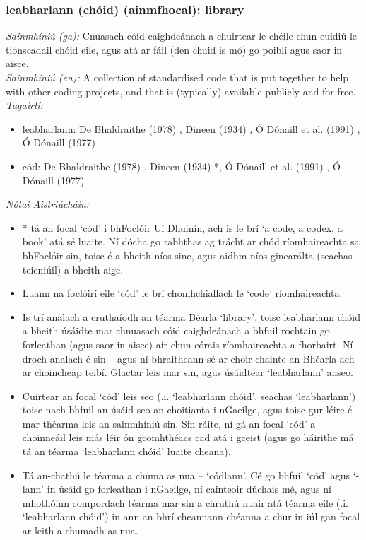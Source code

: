\documentclass{article}
\begin{document}
\subsubsection*{leabharlann (chóid) (ainmfhocal): library}
 \noindent \textit{Sainmhíniú (ga):} Cnuasach cóid caighdeánach a chuirtear le chéile chun cuidiú le tionscadail chóid eile, agus atá ar fáil (den chuid is mó) go poiblí agus saor in aisce.
\\
 \noindent \textit{Sainmhíniú (en):} A collection of standardised code that is put together to help with other coding projects, and that is (typically) available publicly and for free.
\\
 \noindent \textit{Tagairtí:}
\begin{itemize}
	\item leabharlann: De Bhaldraithe (1978) \cite{de-bhaldraithe}, Dineen (1934) \cite{dineen}, Ó Dónaill et al. (1991) \cite{focloir-beag}, Ó Dónaill (1977) \cite{odonaill}
	\item cód: De Bhaldraithe (1978) \cite{de-bhaldraithe}, Dineen (1934) \cite{dineen}*, Ó Dónaill et al. (1991) \cite{focloir-beag}, Ó Dónaill (1977) \cite{odonaill}
\end{itemize}

 \noindent \textit{Nótaí Aistriúcháin:}
\begin{itemize}
	\item * tá an focal `cód' i bhFoclóir Uí Dhuinín, ach is le brí `a code, a codex, a book' atá sé luaite. Ní dócha go rabhthas ag trácht ar chód ríomhaireachta sa bhFoclóir sin, toisc é a bheith níos sine, agus aidhm níos ginearálta (seachas teicniúil) a bheith aige.
	\item Luann na foclóirí eile `cód' le brí chomhchiallach le `code' ríomhaireachta.
	\item Is trí analach a cruthaíodh an téarma Béarla `library', toisc leabharlann chóid a bheith úsáidte mar chnuasach cóid caighdeánach a bhfuil rochtain go forleathan (agus saor in aisce) air chun córais ríomhaireachta a fhorbairt. Ní droch-analach é sin -- agus ní bhraitheann sé ar choir chainte an Bhéarla ach ar choincheap teibí. Glactar leis mar sin, agus úsáidtear `leabharlann' anseo.
	\item Cuirtear an focal `cód' leis seo (.i. `leabharlann chóid', seachas `leabharlann') toisc nach bhfuil an úsáid seo an-choitianta i nGaeilge, agus toisc gur léire é mar théarma leis an sainmhíniú sin. Sin ráite, ní gá an focal `cód' a choinneáil leis más léir ón gcomhthéacs cad atá i gceist (agus go háirithe má tá an téarma `leabharlann chóid' luaite cheana).
	\item Tá an-chathú le téarma a chuma as nua -- `códlann'. Cé go bhfuil `cód' agus `-lann' in úsáid go forleathan i nGaeilge, ní cainteoir dúchais mé, agus ní mhothóinn compordach téarma mar sin a chruthú nuair atá téarma eile (.i. `leabharlann chóid') in ann an bhrí cheannann chéanna a chur in iúl gan focal ar leith a chumadh as nua.
\end{itemize}
\end{document}
